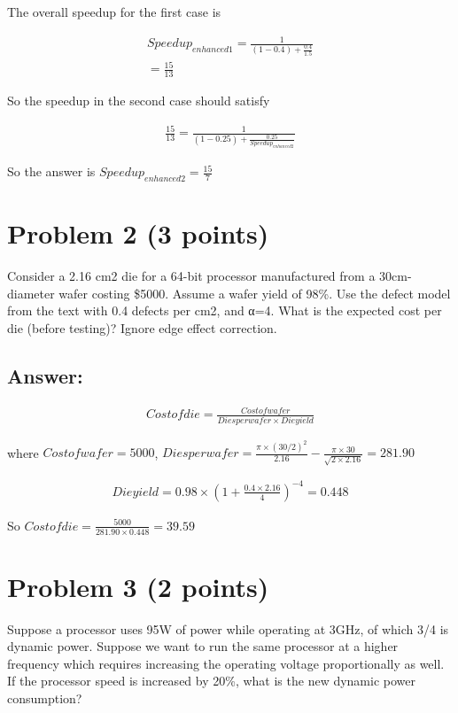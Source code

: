 \documentclass[letter,11pt,leqno]{article}
\begin{document}
The overall speedup for the first case is

\begin{eqnarray*}
  Speedup_{enhanced1} = \frac{1}
  {(1-0.4)+\frac{0.4}{1.5}}\\
  = \frac{15}{13}
\end{eqnarray*}

So the speedup in the second case should satisfy

\begin{eqnarray*}
  \frac{15}{13} = \frac{1}
       {(1-0.25)+\frac{0.25}{Speedup_{enhanced2}}}
\end{eqnarray*}

So the answer is $Speedup_{enhanced2}=\frac{15}{7}$

\section*{Problem 2 (3 points)}
Consider a 2.16 cm2 die for a 64-bit processor manufactured from a 30cm-diameter wafer costing \$5000. Assume a wafer yield of 98\%. Use the defect model from the text with 0.4 defects per cm2, and α=4. What is the expected cost per die (before testing)? Ignore edge effect correction.

\subsection*{Answer:}

\begin{eqnarray*}
Cost of die = \frac{Cost of wafer}{Dies per wafer\times{}Die yield}
\end{eqnarray*}

where $Cost of wafer=5000$, $Dies per wafer=\frac{\pi\times(30/2)^2}{2.16}-\frac{\pi\times30}{\sqrt{2\times2.16}} = 281.90$

\begin{eqnarray*}
  Die yield = 0.98 \times (1+\frac{0.4\times2.16}{4})^{-4} = 0.448
\end{eqnarray*}

So $Cost of die = \frac{5000}{281.90\times0.448} = 39.59$

\section*{Problem 3 (2 points)}Suppose a processor uses 95W of power while operating at 3GHz, of which 3/4 is dynamic power. Suppose we want to run the same processor at a higher frequency which requires increasing the operating voltage proportionally as well. If the processor speed is increased by 20\%, what is the new dynamic power consumption?
\end{document}
